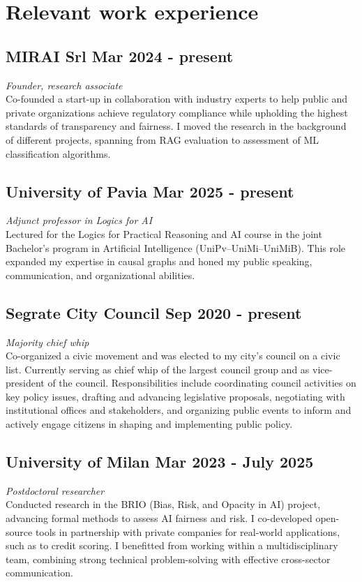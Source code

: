\documentclass[a4paper,11pt]{article}
\begin{document}
\section*{ Relevant work experience}

\subsection*{MIRAI Srl \hfill Mar 2024 - present}
\textit{Founder, research associate} \\
Co-founded a start-up in collaboration with industry experts to help public and private organizations achieve regulatory compliance while upholding the highest standards of transparency and fairness. I moved the research in the background of different projects, spanning from RAG evaluation to assessment of ML classification algorithms.

\subsection*{University of Pavia \hfill Mar 2025 - present}
\textit{Adjunct professor in Logics for AI} \\
Lectured for the Logics for Practical Reasoning and AI course in the joint Bachelor’s program in Artificial Intelligence (UniPv–UniMi–UniMiB). This role expanded my expertise in causal graphs and honed my public speaking, communication, and organizational abilities.

\subsection*{Segrate City Council \hfill Sep 2020 - present}
\textit{Majority chief whip} \\
Co-organized a civic movement and was elected to my city’s council on a civic list. Currently serving as chief whip of the largest council group and as vice-president of the council. Responsibilities include coordinating council activities on key policy issues, drafting and advancing legislative proposals, negotiating with institutional offices and stakeholders, and organizing public events to inform and actively engage citizens in shaping and implementing public policy.

\subsection*{University of Milan \hfill Mar 2023 - July 2025}
\textit{Postdoctoral researcher} \\
Conducted research in the BRIO (Bias, Risk, and Opacity in AI) project, advancing formal methods to assess AI fairness and risk. I co-developed open-source tools in partnership with private companies for real-world applications, such as to credit scoring. I benefitted from working within a multidisciplinary team, combining strong technical problem-solving with effective cross-sector communication.
\end{document}
